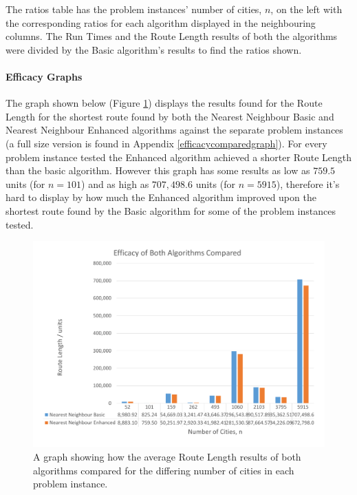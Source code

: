 \documentclass[conference,backref=page]{acmsiggraph}
\begin{document}
The ratios table has the problem instances' number of cities, $n$, on the left with the corresponding ratios for each algorithm displayed in the neighbouring columns. The Run Times and the Route Length results of both the algorithms were divided by the Basic algorithm's results to find the ratios shown.


\paragraph{Efficacy Graphs}
The graph shown below (Figure \ref{efficacycomparedcolumngraph}) displays the results found for the Route Length for the shortest route found by both the Nearest Neighbour Basic and Nearest Neighbour Enhanced algorithms against the separate problem instances (a full size version is found in Appendix \ref{efficacycomparedgraph}). For every problem instance tested the Enhanced algorithm achieved a shorter Route Length than the basic algorithm. However this graph has some results as low as $759.5$ units (for $n = 101$) and as high as $707,498.6$ units (for $n = 5915$), therefore it's hard to display by how much the Enhanced algorithm improved upon the shortest route found by the Basic algorithm for some of the problem instances tested.

\begin{figure}[h]
	\includegraphics[width=\columnwidth]{images/efficacy_compared_column.pdf}
	\caption{A graph showing how the average Route Length results of both algorithms compared for the differing number of cities in each problem instance.}
	\label{efficacycomparedcolumngraph}
\end{figure}
\end{document}
